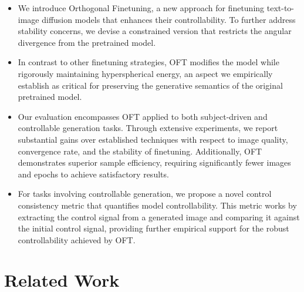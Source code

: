 \begin{itemize}[leftmargin=*,nosep]

    \item We introduce Orthogonal Finetuning, a new approach for finetuning text-to-image diffusion models that enhances their controllability. To further address stability concerns, we devise a constrained version that restricts the angular divergence from the pretrained model.
    \item In contrast to other finetuning strategies, OFT modifies the model while rigorously maintaining hyperspherical energy, an aspect we empirically establish as critical for preserving the generative semantics of the original pretrained model.
    \item Our evaluation encompasses OFT applied to both subject-driven and controllable generation tasks. Through extensive experiments, we report substantial gains over established techniques with respect to image quality, convergence rate, and the stability of finetuning. Additionally, OFT demonstrates superior sample efficiency, requiring significantly fewer images and epochs to achieve satisfactory results.
    \item For tasks involving controllable generation, we propose a novel control consistency metric that quantifies model controllability. This metric works by extracting the control signal from a generated image and comparing it against the initial control signal, providing further empirical support for the robust controllability achieved by OFT.
\end{itemize}

\section{Related Work}

